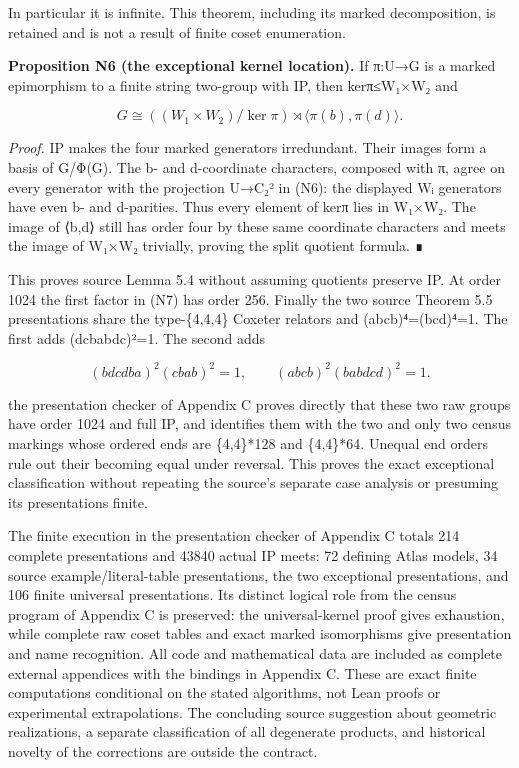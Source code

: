 \documentclass[
  11pt,
  a4paper,
]{article}
\begin{document}
In particular it is infinite. This theorem, including its marked
decomposition, is retained and is not a result of finite coset
enumeration.

\textbf{Proposition N6 (the exceptional kernel location).} If π:U→G is a
marked epimorphism to a finite string two-group with IP, then kerπ≤W₁×W₂
and

\[
G\cong ((W_1\times W_2)/\ker\pi)\rtimes\langle\pi(b),\pi(d)\rangle.
\tag{N7}
\]

\emph{Proof.} IP makes the four marked generators irredundant. Their
images form a basis of G/Φ(G). The b- and d-coordinate characters,
composed with π, agree on every generator with the projection U→C₂² in
(N6): the displayed Wᵢ generators have even b- and d-parities. Thus
every element of kerπ lies in W₁×W₂. The image of ⟨b,d⟩ still has order
four by these same coordinate characters and meets the image of W₁×W₂
trivially, proving the split quotient formula. ∎

This proves source Lemma 5.4 without assuming quotients preserve IP. At
order 1024 the first factor in (N7) has order 256. Finally the two
source Theorem 5.5 presentations share the type-\{4,4,4\} Coxeter
relators and (abcb)⁴=(bcd)⁴=1. The first adds (dcbabdc)²=1. The second
adds

\[
(bdcdba)^2(cbab)^2=1,\qquad(abcb)^2(babdcd)^2=1.
\tag{N8}
\]

the presentation checker of Appendix C proves directly that these two
raw groups have order 1024 and full IP, and identifies them with the two
and only two census markings whose ordered ends are \{4,4\}*128 and
\{4,4\}*64. Unequal end orders rule out their becoming equal under
reversal. This proves the exact exceptional classification without
repeating the source's separate case analysis or presuming its
presentations finite.

The finite execution in the presentation checker of Appendix C totals
214 complete presentations and 43840 actual IP meets: 72 defining Atlas
models, 34 source example/literal-table presentations, the two
exceptional presentations, and 106 finite universal presentations. Its
distinct logical role from the census program of Appendix C is
preserved: the universal-kernel proof gives exhaustion, while complete
raw coset tables and exact marked isomorphisms give presentation and
name recognition. All code and mathematical data are included as
complete external appendices with the bindings in Appendix C. These are
exact finite computations conditional on the stated algorithms, not Lean
proofs or experimental extrapolations. The concluding source suggestion
about geometric realizations, a separate classification of all
degenerate products, and historical novelty of the corrections are
outside the contract.
\end{document}
